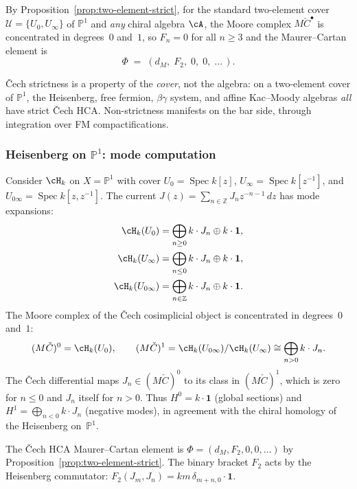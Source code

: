 By Proposition~\ref{prop:two-element-strict}, for the standard
two-element cover $\mathcal{U} = \{U_0, U_\infty\}$ of
$\mathbb{P}^1$ and \emph{any} chiral algebra $\cA$, the Moore
complex $M\check{C}^\bullet$ is concentrated in degrees~$0$
and~$1$, so $F_n = 0$ for all $n \geq 3$ and the
Maurer--Cartan element is
\[
\Phi \;=\; (d_M,\; F_2,\; 0,\; 0,\; \ldots\,).
\]

\noindent
\v{C}ech strictness is a property of the
\emph{cover}, not the algebra: on a two-element cover of
$\mathbb{P}^1$, the Heisenberg, free fermion, $\beta\gamma$ system,
and affine Kac--Moody algebras \emph{all} have strict \v{C}ech HCA.
Non-strictness manifests on the bar side, through integration over
FM compactifications.

\subsubsection{Heisenberg on $\mathbb{P}^1$: mode computation}
\label{subsec:cech-heisenberg-p1}

Consider $\cH_k$ on $X = \mathbb{P}^1$ with cover
$U_0 = \operatorname{Spec}k[z]$,
$U_\infty = \operatorname{Spec}k[z^{-1}]$, and
$U_{0\infty} = \operatorname{Spec}k[z,z^{-1}]$.
The current $J(z) = \sum_{n \in \mathbb{Z}} J_n z^{-n-1}\,dz$
has mode expansions:
\begin{align*}
\cH_k(U_0) &= \bigoplus_{n \geq 0} k \cdot J_n
 \oplus k \cdot \mathbf{1}, \\
\cH_k(U_\infty) &= \bigoplus_{n \leq 0} k \cdot J_n
 \oplus k \cdot \mathbf{1}, \\
\cH_k(U_{0\infty}) &= \bigoplus_{n \in \mathbb{Z}} k \cdot J_n
 \oplus k \cdot \mathbf{1}.
\end{align*}
The Moore complex of the \v{C}ech cosimplicial object is
concentrated in degrees~$0$ and~$1$:
\[
(M\check{C})^0 = \cH_k(U_0),
\qquad
(M\check{C})^1 = \cH_k(U_{0\infty}) / \cH_k(U_\infty)
 \cong \bigoplus_{n > 0} k \cdot J_n.
\]
The \v{C}ech differential maps
$J_n \in (M\check{C})^0$ to its class in
$(M\check{C})^1$, which is zero for $n \leq 0$ and $J_n$ itself
for $n > 0$. Thus $H^0 = k \cdot \mathbf{1}$ (global sections)
and $H^1 = \bigoplus_{n < 0} k \cdot J_n$ (negative modes), in
agreement with the chiral homology of the Heisenberg
on~$\mathbb{P}^1$.

The \v{C}ech HCA Maurer--Cartan element is
$\Phi = (d_M, F_2, 0, 0, \ldots)$ by
Proposition~\ref{prop:two-element-strict}. The binary bracket
$F_2$ acts by the Heisenberg commutator:
$F_2(J_m, J_n) = km\,\delta_{m+n,0} \cdot \mathbf{1}$.

